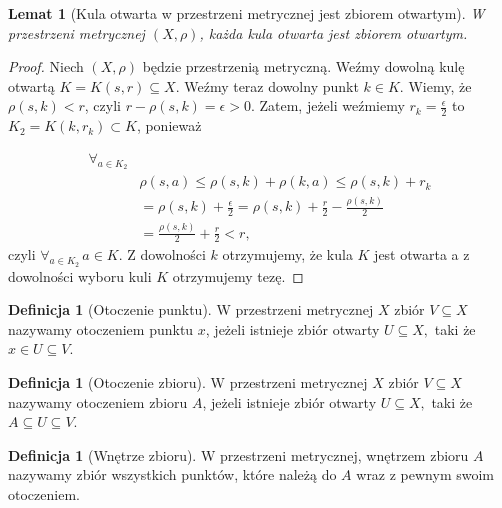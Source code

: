 \documentclass[licencjacka]{pwr_wmat_praca_dyplomowa}
\theoremstyle{plain}
\numberwithin{theorem}{chapter}
\newtheorem{lemma}[theorem]{Lemat}
\theoremstyle{definition}
\numberwithin{theorem}{chapter}
\newtheorem{definition}[theorem]{Definicja}
\begin{document}
\begin{lemma}[Kula otwarta w przestrzeni metrycznej jest zbiorem otwartym]\label{kula_otwarta_jest_zbiorem_otwartym}
W przestrzeni metrycznej $(X, \rho)$, każda kula otwarta jest zbiorem otwartym.
\end{lemma}

\begin{proof}
Niech $(X, \rho)$ będzie przestrzenią metryczną. Weźmy dowolną kulę otwartą $K = K(s, r) \subseteq X$. Weźmy teraz dowolny punkt $k \in K$. Wiemy, że $\rho(s, k) < r$, czyli $r - \rho(s, k) = \epsilon > 0$. Zatem, jeżeli weźmiemy $r_k = \frac{\epsilon}{2}$ to $K_2 = K(k, r_k) \subset K$, ponieważ 

\begin{equation}
\begin{aligned}
\forall_{a \in K_2} \\
& \rho(s, a) \leq \rho(s, k) + \rho(k, a) \leq \rho(s, k) + r_k \\
& = \rho(s, k) + \frac{\epsilon}{2} = \rho(s, k) + \frac{r}{2} - \frac{\rho(s, k)}{2} \\
& = \frac{\rho(s, k)}{2} + \frac{r}{2} < r,
\end{aligned}
\end{equation}
czyli $\forall_{a \in K_2} \, a \in K.$ Z dowolności $k$ otrzymujemy, że kula $K$ jest otwarta a z dowolności wyboru kuli $K$ otrzymujemy tezę.
\end{proof}


\begin{definition}[Otoczenie punktu]
W przestrzeni metrycznej $X$ zbiór $V \subseteq X$ nazywamy otoczeniem punktu $x$, jeżeli istnieje zbiór otwarty $U \subseteq X,$ taki że $x \in U \subseteq V$.
\end{definition}

\begin{definition}[Otoczenie zbioru]
W przestrzeni metrycznej $X$ zbiór $V \subseteq X$ nazywamy otoczeniem zbioru $A$, jeżeli istnieje zbiór otwarty $U \subseteq X,$ taki że $A \subseteq U \subseteq V$.
\end{definition}



\begin{definition}[Wnętrze zbioru]
W przestrzeni metrycznej, wnętrzem zbioru $A$ nazywamy zbiór wszystkich punktów, które należą do $A$ wraz z pewnym swoim otoczeniem.
\end{definition}
\end{document}

